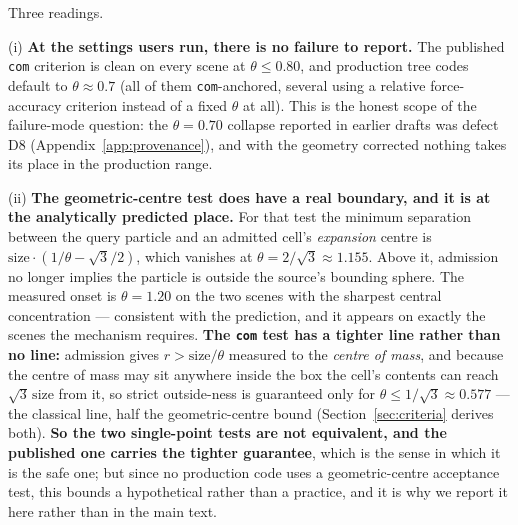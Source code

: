 \begin{center}
\end{center}

\noindent Three readings.

(i) \textbf{At the settings users run, there is no failure to report.} The published \texttt{com}
criterion is clean on every scene at $\theta\le0.80$, and production tree codes default to
$\theta\approx0.7$ (all of them \texttt{com}-anchored, several using a relative force-accuracy
criterion instead of a fixed $\theta$ at all). This is the honest scope of the failure-mode question:
the $\theta=0.70$ collapse reported in earlier drafts was defect D8
(Appendix~\ref{app:provenance}), and with the geometry corrected nothing takes its place in the
production range.

(ii) \textbf{The geometric-centre test does have a real boundary, and it is at the analytically
predicted place.} For that test the minimum separation between the query particle and an admitted
cell's \emph{expansion} centre is $\text{size}\cdot(1/\theta-\sqrt{3}/2)$, which vanishes at
$\theta=2/\sqrt{3}\approx1.155$. Above it, admission no longer implies the particle is outside the
source's bounding sphere. The measured onset is $\theta=1.20$ on the two scenes with the sharpest
central concentration --- consistent with the prediction, and it appears on exactly the scenes the
mechanism requires. \textbf{The \texttt{com} test has a tighter line rather than no line:} admission
gives $r>\text{size}/\theta$ measured to the \emph{centre of mass}, and because the centre of mass may
sit anywhere inside the box the cell's contents can reach $\sqrt3\,\text{size}$ from it, so strict
outside-ness is guaranteed only for $\theta\le1/\sqrt3\approx0.577$ --- the classical line, half the
geometric-centre bound (Section~\ref{sec:criteria} derives both). \textbf{So the two single-point tests
are not equivalent, and the published one carries the tighter guarantee}, which is the sense in which
it is the safe one; but since no production code uses a
geometric-centre acceptance test, this bounds a hypothetical rather than a practice, and it is why we
report it here rather than in the main text.

